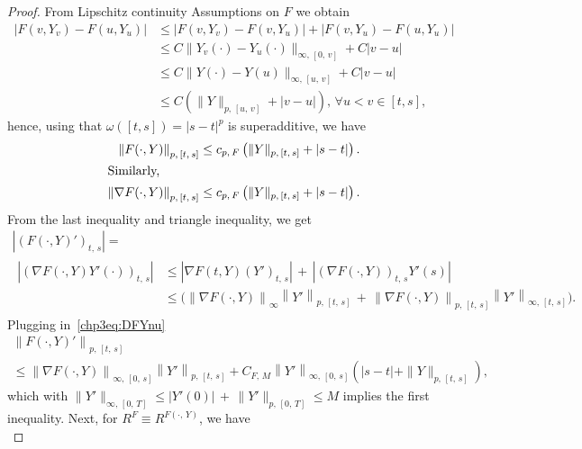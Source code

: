 \documentclass[AHL,Unicode,longabstracts,published]{cedram}
\let\oldforall\forall
\renewcommand*{\forall}{\mathrel{\oldforall}}
\begin{document}
\begin{proof}
From Lipschitz continuity Assumptions on $F$ we obtain
\begin{align*}
\left|F\left(v,Y_v\right)-F\left(u,Y_u\right)\right|
&\leq \left|F\left(v,Y_v\right)-F\left(v,Y_{u}\right)\right|+\left|F\left(v,Y_{u}\right)-F\left(u,Y_u\right)\right|\\
&\leq C\|Y_v(\cdot)-Y_{u}(\cdot)\|_{\infty,\,[0,\, v]}+C|v-u|\\
&\leq C\|Y(\cdot)-Y(u)\|_{\infty,\,[u,\,v]}+C|v-u|\\
&\leq C\left(\|Y\|_{p,\,[u,\,v]}+|v-u|\right),\, \forall u<v\in [t, s],
\end{align*}
hence, using that $\omega([t, s])=|s-t|^p$ is superadditive, we have
\begin{align}
\left\|F(\cdot, Y)\right\|_{p,\,[t,\,s]} &\leq c_{p,\,F}\left(\|Y\|_{p,\,[t,\,s]}+|s-t|\right). \label{chp3eq:DYp}\\
\intertext{Similarly,}
\left\|\nabla F(\cdot, Y)\right\|_{p,\,[t,\,s]} &\leq c_{p,\,F}\left(\|Y\|_{p,\,[t,\,s]}+|s-t|\right).\label{chp3eq:DFYnu}
\end{align}
From the last inequality and triangle inequality, we get
\begin{multline*}
\left|\left(F(\cdot,Y)'\right)_{t,\,s}\right| = \\
\begin{aligned}
\left|\left(\nabla F(\cdot,Y) Y'(\cdot)\right)_{t,\,s}\right|
&\leq \left|\nabla F(t,Y)\left(Y'\right)_{t,\,s}\right|\, +\,\left|\left(\nabla F(\cdot, Y)\right)_{t,\,s}Y'(s)\right|\\
&\leq\Big(\left\|\nabla F(\cdot,Y)\right\|_{\infty}\left\|Y'\right\|_{p,\,[t,\,s]}\,+\,\left\|\nabla F(\cdot, Y)\right\|_{p,\,[t,\,s]}\left\|Y'\right\|_{\infty,\,[t,\,s]}\Big).
\end{aligned}
\end{multline*}
Plugging in~\eqref{chp3eq:DFYnu}
\begin{multline}\label{chp3eq:FYnu}
\left\|F(\cdot, Y)'\right\|_{p,\,[t,\,s]}\\
\leq \left\|\nabla F(\cdot,Y)\right\|_{\infty,\, [0,\,s]}\left\|Y'\right\|_{p,\,[t,\,s]}+C_{F,\,M}\left\|Y'\right\|_{\infty,\,[0,\,s]}\left(|s-t|+ \|Y\|_{p,\,[t,\,s]}\right),
\end{multline}
which with $\|Y'\|_{\infty,\,[0,\,T]}\leq |Y'(0)|\,+\, \|Y'\|_{p,\,[0,\,T]}\leq M$ implies the first inequality. Next, for $R^F\equiv R^{F(\cdot,\,Y)}$, we have
\begin{equation}\label{chp3eq:RFts}

\end{equation}
\end{proof}
\end{document}
